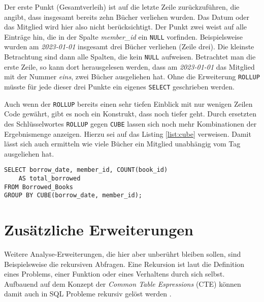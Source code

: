 Der erste Punkt (Gesamtverleih) ist auf die letzte Zeile zurückzuführen, die
angibt, dass insgesamt bereits zehn Bücher verliehen wurden. Das Datum oder das
Mitglied wird hier also nicht berücksichtigt. Der Punkt zwei weist auf alle Einträge
hin, die in der Spalte \textit{member\_id} ein \texttt{NULL} vorfinden. Beispielsweise
wurden am \textit{2023-01-01} insgesamt drei Bücher verliehen (Zeile drei). Die kleinste
Betrachtung sind dann alle Spalten, die kein \texttt{NULL} aufweisen. Betrachtet
man die erste Zeile, so kann dort herausgelesen werden, dass am \textit{2023-01-01}
das Mitglied mit der Nummer \textit{eins}, zwei Bücher ausgeliehen hat. Ohne die
Erweiterung \texttt{ROLLUP} müsste für jede dieser drei Punkte ein eigenes \texttt{SELECT}
geschrieben werden.

Auch wenn der \texttt{ROLLUP} bereits einen sehr tiefen Einblick mit nur wenigen
Zeilen Code gewährt, gibt es noch ein Konstrukt, dass noch tiefer geht. Durch
ersetzten des Schlüsselwortes \texttt{ROLLUP} gegen \texttt{CUBE} lassen sich
noch mehr Kombinationen der Ergebnismenge anzeigen. Hierzu sei auf das Listing \ref{list:cube}
verweisen. Damit lässt sich auch ermitteln wie viele Bücher ein Mitglied
unabhängig vom Tag ausgeliehen hat.

\begin{lstlisting}[caption={Beispiel eines \texttt{CUBE}}, label={list:cube}]
SELECT borrow_date, member_id, COUNT(book_id)
	AS total_borrowed
FROM Borrowed_Books
GROUP BY CUBE(borrow_date, member_id);
\end{lstlisting}

\section{Zusätzliche Erweiterungen}
\label{sec:zus_erweiterungen} Weitere Analyse-Erweiterungen, die hier aber
unberührt bleiben sollen, sind Beispielsweise die rekursiven Abfragen. Eine
Rekursion ist laut \citet[S. 151-155]{benecke1998rekursion} die Definition eines
Problems, einer Funktion oder eines Verhaltens durch sich selbst. Aufbauend auf dem
Konzept der \textit{Common Table Espressions} (CTE) können damit auch in SQL
Probleme rekursiv gelöst werden \citep[vgl.][]{Ignacio2022}.
